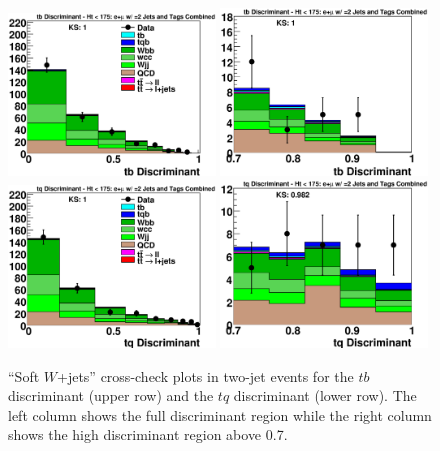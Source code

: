 \clearpage
\begin{figure}[!h!tbp]
\includegraphics[width=0.49\textwidth]
{eps/MatrixElement/cross_check/combined/2jet/Wjets_tb_Discriminant}
\includegraphics[width=0.49\textwidth]
{eps/MatrixElement/cross_check/combined/2jet/Wjets_tb_Discriminant_Zoom}
\includegraphics[width=0.49\textwidth]
{eps/MatrixElement/cross_check/combined/2jet/Wjets_tq_Discriminant}
\includegraphics[width=0.49\textwidth]
{eps/MatrixElement/cross_check/combined/2jet/Wjets_tq_Discriminant_Zoom}
\vspace{-0.1in}
\caption{``Soft $W$+jets'' cross-check plots in two-jet
events for the $tb$ discriminant (upper row) and the $tq$ discriminant
(lower row). The left column shows the full discriminant region while
the right column shows the high discriminant region above 0.7.}
\label{wjets-cross-2jet}
\end{figure}

